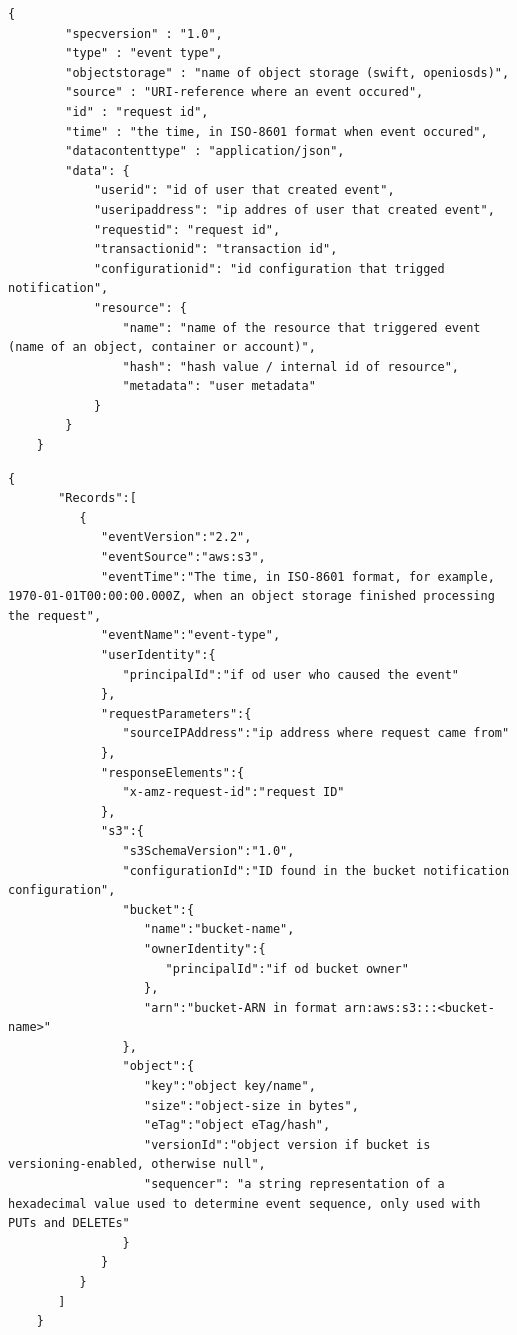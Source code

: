     \begin{lstlisting}[style=jsonStyle, caption=CloudEvents structure of event notification published by EventNotification middleware., label=lst:eventStructureCE]
    {
        "specversion" : "1.0",
        "type" : "event type",
        "objectstorage" : "name of object storage (swift, openiosds)",
        "source" : "URI-reference where an event occured",
        "id" : "request id",
        "time" : "the time, in ISO-8601 format when event occured",
        "datacontenttype" : "application/json",
        "data": {
            "userid": "id of user that created event",
            "useripaddress": "ip addres of user that created event",
            "requestid": "request id",
            "transactionid": "transaction id",
            "configurationid": "id configuration that trigged notification",
            "resource": {
                "name": "name of the resource that triggered event (name of an object, container or account)",
                "hash": "hash value / internal id of resource",
                "metadata": "user metadata"
            }
        }
    }
    \end{lstlisting}

    \begin{lstlisting}[style=jsonStyle, caption=Amazon S3 structure of event notification published by EventNotification middleware., label=lst:eventStructureS3]
    {
       "Records":[
          {
             "eventVersion":"2.2",
             "eventSource":"aws:s3",
             "eventTime":"The time, in ISO-8601 format, for example, 1970-01-01T00:00:00.000Z, when an object storage finished processing the request",
             "eventName":"event-type",
             "userIdentity":{
                "principalId":"if od user who caused the event"
             },
             "requestParameters":{
                "sourceIPAddress":"ip address where request came from"
             },
             "responseElements":{
                "x-amz-request-id":"request ID"
             },
             "s3":{
                "s3SchemaVersion":"1.0",
                "configurationId":"ID found in the bucket notification configuration",
                "bucket":{
                   "name":"bucket-name",
                   "ownerIdentity":{
                      "principalId":"if od bucket owner"
                   },
                   "arn":"bucket-ARN in format arn:aws:s3:::<bucket-name>"
                },
                "object":{
                   "key":"object key/name",
                   "size":"object-size in bytes",
                   "eTag":"object eTag/hash",
                   "versionId":"object version if bucket is versioning-enabled, otherwise null",
                   "sequencer": "a string representation of a hexadecimal value used to determine event sequence, only used with PUTs and DELETEs"
                }
             }
          }
       ]
    }
    \end{lstlisting}

